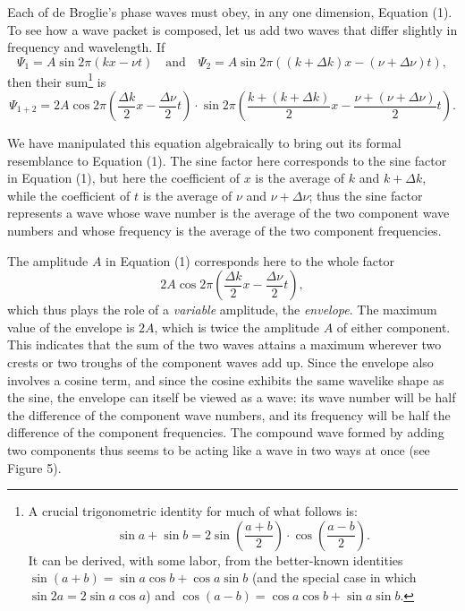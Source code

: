 Each of de Broglie's phase waves must obey, in any one dimension,
Equation (1). To see how a wave packet is composed, let us add two waves
that differ slightly in frequency and wavelength. If
\begin{equation*}
\Psi_1  = A\sin 2\pi(kx-\nu t)\quad\text{and}\quad\Psi_2 = 
A\sin 2\pi((k+\Delta k)x - (\nu + \Delta\nu)t),
\end{equation*}
then their sum\footnote{A crucial trigonometric identity for much of
  what follows is: 
  \begin{equation*}
  \sin a + \sin b = 2 \sin\left(\frac{a+b}{2}\right)\cdot\cos\left(\frac{a-b}{2}\right).
  \end{equation*}
  It can be derived, with some labor, from the better-known identities $\sin{(a+b)} = 
  \sin a\cos b + \cos a\sin b$
  (and the special case in which $\sin{2a} = 2\sin{a}\cos{a}$) and
  $\cos{(a-b)} = \cos{a}\cos{b} + \sin{a}\sin{b}$.} is
\begin{equation*}
\Psi_{1+2} = 2A\cos 2\pi\left(\frac{\Delta k}{2}x - \frac{\Delta\nu}{2}t\right)
\cdot \sin 2\pi\left(\frac{k+(k+\Delta k)}{2}x - \frac{\nu+(\nu+ \Delta\nu)}{2}t\right).
\end{equation*}

We have manipulated this equation algebraically to bring out its formal
resemblance to Equation (1). The sine factor here corresponds to the sine
factor in Equation (1), but here the coefficient of $x$ is the
average of $k$ and $k + \Delta k$, while the coefficient of
$t$ is the average of $\nu$ and $\nu + \Delta\nu$; thus the
sine factor represents a wave whose wave number is the average of the
two component wave numbers and whose frequency is the average of the two
component frequencies.

The amplitude $A$ in Equation (1) corresponds here to the whole
factor 
%
\begin{equation*}
2A\cos 2\pi\left(\frac{\Delta k}{2}x - \frac{\Delta\nu}{2}t\right) , 
\end{equation*}
%
which thus plays the role of a \emph{variable} amplitude, the
\emph{envelope}. The maximum value of the envelope is $2A$, which
is twice the amplitude $A$ of either component. This indicates that
the sum of the two waves attains a maximum wherever two crests or two
troughs of the component waves add up. Since the envelope also involves
a cosine term, and since the cosine exhibits the same wavelike shape as
the sine, the envelope can itself be viewed as a wave: its wave number
will be half the difference of the component wave numbers, and its
frequency will be half the difference of the component frequencies. The
compound wave formed by adding two components thus seems to be acting
like a wave in two ways at once (see Figure 5).

